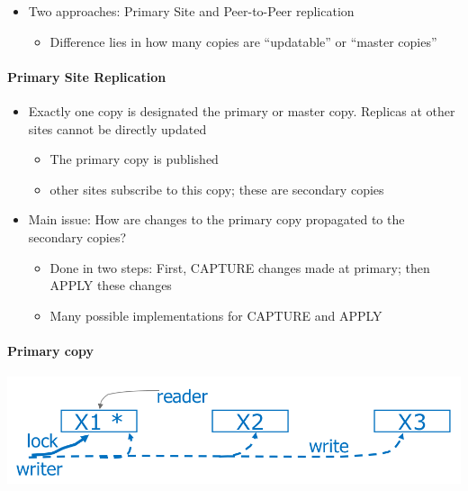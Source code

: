 \begin{itemize}
\item Two approaches: Primary Site and Peer-to-Peer replication
  \begin{itemize}
  \item Difference lies in how many copies are ``updatable''
    or ``master copies''
  \end{itemize}
\end{itemize}

\paragraph{Primary Site Replication}
\begin{itemize}
\item Exactly one copy is designated the primary or master copy.
  Replicas at other sites cannot be directly updated
  \begin{itemize}
  \item The primary copy is published
  \item other sites subscribe to this copy; these are secondary copies
  \end{itemize}
\end{itemize}

\begin{itemize}
\item Main issue: How are changes to the primary copy propagated to the
  secondary copies?
  \begin{itemize}
  \item Done in two steps: First, CAPTURE changes made at primary;
    then APPLY these changes
  \item Many possible implementations for CAPTURE and APPLY
  \end{itemize}
\end{itemize}

\paragraph{Primary copy}

\includegraphics[scale=0.15]{graphics/primary-copy.png}

